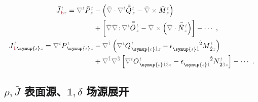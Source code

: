 \begin{subequations}
\begin{align}
\bar{J}^{\;\!\mathcolor{gray}{t}}_{\;\!\textcolor{Maroon}{\text{b}}\mathcolor{gray}{z}} = \mathcolor{gray}{\nabla^t} \bar{P}^{\;\!\mathcolor{gray}{t}}_{\;\!\mathcolor{gray}{z}} &- \left( \mathcolor{gray}{\bar{\nabla} \cdot} \mathcolor{gray}{\nabla^t} \bar{\bar{Q}}^{\;\!\mathcolor{gray}{t}}_{\;\!\mathcolor{gray}{z}} - \mathcolor{gray}{\bar{\nabla} \times} \bar{M}^{\;\!\mathcolor{gray}{t}}_{\;\!\mathcolor{gray}{z}} \right) \label{eq:J-b} \\ &+ \left[ \mathcolor{gray}{\bar{\nabla}} \mathcolor{gray}{\bar{\nabla} \colon}\! \mathcolor{gray}{\nabla^t} \bar{\bar{\bar{O}}}^{\;\!\mathcolor{gray}{t}}_{\;\!\mathcolor{gray}{z}} - \mathcolor{gray}{\bar{\nabla} \times} \left( \mathcolor{gray}{\bar{\nabla} \cdot}  \bar{\bar{N}}^{\;\!\mathcolor{gray}{t}}_{\;\!\mathcolor{gray}{z}} \right) \right] - \cdots~, \\
J^{\;\!\mathcolor{gray}{t}}_{\;\!\textcolor{Maroon}{\text{b}} \symup{\iota} \mathcolor{gray}{z}} = \mathcolor{gray}{\nabla^t} P^{\;\!\mathcolor{gray}{t}}_{\;\! \symup{\iota}\mathcolor{gray}{z}} &- \mathcolor{gray}{\nabla^{\hat{1}}} \left( \mathcolor{gray}{\nabla^t} Q^{\;\!\mathcolor{gray}{t}}_{\;\! \symup{\iota} \mathcolor{gray}{\hat{1}} \mathcolor{gray}{z}} - \epsilon^{\hphantom{\symup{\iota}\hat{1}}\hat{2}}_{\symup{\iota}\mathcolor{gray}{\hat{1}}} M^{\;\!\mathcolor{gray}{t}}_{\;\! \hat{2}\mathcolor{gray}{z}} \right) \label{eq:j-b} \\ &+ \mathcolor{gray}{\nabla^{\hat{1}}} \mathcolor{gray}{\nabla^{\hat{3}}} \left[ \mathcolor{gray}{\nabla^t} O^{\;\!\mathcolor{gray}{t}}_{\;\! \symup{\iota} \mathcolor{gray}{\hat{1}\hat{3}} \mathcolor{gray}{z}} - \epsilon^{\hphantom{\symup{\iota}\hat{1}}\hat{2}}_{\symup{\iota}\mathcolor{gray}{\hat{1}}} N^{\;\!\mathcolor{gray}{t}}_{\;\! \hat{2} \mathcolor{gray}{\hat{3}} \mathcolor{gray}{z}} \right] - \cdots~.
\end{align}
\end{subequations}

\clearpage
\vspace*{-6.5em}

\subsection{${\rho}, \bar{J}$ 表面源、${\mathbb{1}},\delta$ 场源展开}\label{ssec:step-delta}

